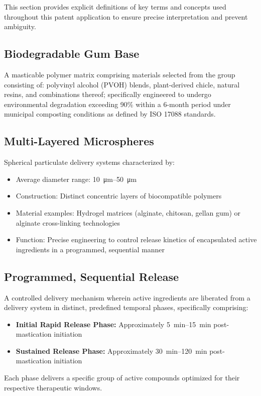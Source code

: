 \documentclass[12pt]{article}
\begin{document}
This section provides explicit definitions of key terms and concepts used throughout this patent application to ensure precise interpretation and prevent ambiguity.

\subsection*{Biodegradable Gum Base}
A masticable polymer matrix comprising materials selected from the group consisting of: polyvinyl alcohol (PVOH) blends, plant-derived chicle, natural resins, and combinations thereof; specifically engineered to undergo environmental degradation exceeding 90\% within a 6-month period under municipal composting conditions as defined by ISO 17088 standards.

\subsection*{Multi-Layered Microspheres}
Spherical particulate delivery systems characterized by:
\begin{itemize}
    \item Average diameter range: \SIrange{10}{50}{\micro\meter}
    \item Construction: Distinct concentric layers of biocompatible polymers
    \item Material examples: Hydrogel matrices (alginate, chitosan, gellan gum) or alginate cross-linking technologies
    \item Function: Precise engineering to control release kinetics of encapsulated active ingredients in a programmed, sequential manner
\end{itemize}

\subsection*{Programmed, Sequential Release}
A controlled delivery mechanism wherein active ingredients are liberated from a delivery system in distinct, predefined temporal phases, specifically comprising:
\begin{itemize}
    \item \textbf{Initial Rapid Release Phase:} Approximately \SIrange{5}{15}{\minute} post-mastication initiation
    \item \textbf{Sustained Release Phase:} Approximately \SIrange{30}{120}{\minute} post-mastication initiation
\end{itemize}
Each phase delivers a specific group of active compounds optimized for their respective therapeutic windows.
\end{document}
